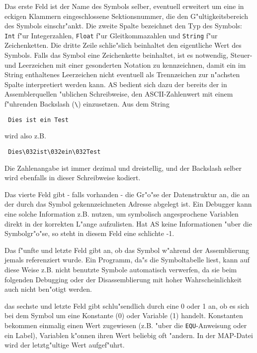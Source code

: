\documentclass[12pt,a4paper,twoside]{report}
\newcommand{\tty}[1]{{\tt #1}}
\begin{document}
Das erste Feld ist der Name des Symbols selber, eventuell erweitert
um eine in eckigen Klammern eingeschlossene Sektionsnummer, die den
G"ultigkeitsbereich des Symbols einschr"ankt.  Die zweite Spalte
bezeichnet den Typ des Symbols: \tty{Int} f"ur Integerzahlen, \tty{Float} f"ur
Gleitkommazahlen und \tty{String} f"ur Zeichenketten.  Die dritte Zeile
schlie"slich beinhaltet den eigentliche Wert des Symbols.  Falls das
Symbol eine Zeichenkette beinhaltet, ist es notwendig, Steuer- und
Leerzeichen mit einer gesonderten Notation zu kennzeichnen, damit ein
im String enthaltenes Leerzeichen nicht eventuell als Trennzeichen
zur n"achsten Spalte interpretiert werden kann.  AS bedient sich dazu
der bereits der in Assemblerquellen "ublichen Schreibweise, den
ASCII-Zahlenwert mit einem f"uhrenden Backslash (\verb!\!) einzusetzen.  Aus
dem String
\begin{verbatim}
 Dies ist ein Test
\end{verbatim}
wird also z.B.
\begin{verbatim}
 Dies\032ist\032ein\032Test
\end{verbatim}
Die Zahlenangabe ist immer dezimal und dreistellig, und der Backslash
selber wird ebenfalls in dieser Schreibweise kodiert.

Das vierte Feld gibt - falls vorhanden - die Gr"o"se der Datenstruktur
an, die an der durch das Symbol gekennzeichneten Adresse abgelegt
ist.  Ein Debugger kann eine solche Information z.B. nutzen, um
symbolisch angesprochene Variablen direkt in der korrekten L"ange
aufzulisten.  Hat AS keine Informationen "uber die Symbolgr"o"se, so
steht in diesem Feld eine schlichte -1.

Das f"unfte und letzte Feld gibt an, ob das Symbol w"ahrend der
Assemblierung jemals referenziert wurde. Ein Programm, da"s die
Symboltabelle liest, kann auf diese Weise z.B. nicht benutzte Symbole
automatisch verwerfen, da sie beim folgenden Debugging oder der
Disassemblierung mit hoher Wahrscheinlichkeit auch nicht ben"otigt werden.

das sechste und letzte Feld gibt schlu"sendlich durch eine 0 oder 1 an,
ob es sich bei dem Symbol um eine Konstante (0) oder Variable (1) handelt.
Konstanten bekommen einmalig einen Wert zugewiesen (z.B. "uber die
\tty{EQU}-Anweisung oder ein Label), Variablen k"onnen ihren Wert beliebig
oft "andern.  In der MAP-Datei wird der letztg"ultige Wert aufgef"uhrt.
\end{document}
